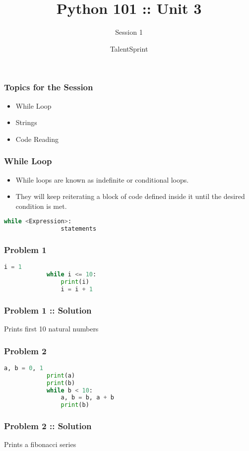 \documentclass[14pt]{beamer}
\title{Python 101 :: Unit 3}
\subtitle{Session 1}
\date{}
\author[TS]{TalentSprint}
\begin{document}
    \begin{frame}
        \titlepage
    \end{frame}
    \begin{frame}
        \frametitle{Topics for the Session}
        \begin{itemize}
            \item While Loop
            \item Strings
            \item Code Reading
        \end{itemize}
    \end{frame}
    \begin{frame}[containsverbatim]
        \frametitle{While Loop}
        \begin{itemize}
            \item While loops are known as indefinite or conditional loops.
            \item They will keep reiterating a block of code defined inside it until the desired condition is met.
        \end{itemize}
	\begin{block}{}
        \begin{lstlisting}[language=Python]
            while <Expression>:
                statements
        \end{lstlisting}
	\end{block}
    \end{frame}
    \begin{frame}[containsverbatim]
        \frametitle{Problem 1}
        \begin{lstlisting}[language=Python]
            i = 1
            while i <= 10:
                print(i)
                i = i + 1
        \end{lstlisting}
    \end{frame}
    \begin{frame}
        \frametitle{Problem 1 :: Solution}
        Prints first 10 natural numbers
    \end{frame}
    \begin{frame}[containsverbatim]
        \frametitle{Problem 2}
        \begin{lstlisting}[language=Python]
            a, b = 0, 1
            print(a)
            print(b)
            while b < 10:
                a, b = b, a + b
                print(b)
        \end{lstlisting}
    \end{frame}
    \begin{frame}
        \frametitle{Problem 2 :: Solution}
        Prints a fibonacci series
    \end{frame}
\end{document}
